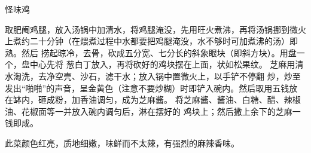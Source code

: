 \begin{recipe}{怪味鸡}

\ingredients


\cooking

\step 取肥阉鸡腿，放入汤锅中加清水，将鸡腿淹没，先用旺火煮沸，再将汤锅挪到微火
上煮约二十分钟（在煨煮过程中水都要把鸡腿淹没，水不够时可加煮沸的汤）即熟。然后
捞起晾冷，去骨，砍成五分宽、七分长的斜象眼块（即斜方块）。用盘一个，盘中心先将
葱白丁放入，再将砍好的鸡块摆在上面，状如松果纹。
\step 芝麻用清水淘洗，去净空壳、沙石，滤干水；放入锅中置微火上，以手铲不停翻
炒，炒至发出“啪啪”的声音，呈金黄色（注意不要炒糊）时即铲入碗内。然后取用五钱放
在缽内，砸成粉，加香油调匀，成为芝麻酱。
\step 将芝麻酱、酱油、白糖、醋、辣椒油、花椒面等一并放入碗内调匀后，淋在摆好的
鸡块上；然后撒上余下的芝麻一钱即成。

\features

此菜颜色红亮，质地细嫩，味鲜而不太辣，有强烈的麻辣香味。

\end{recipe}

